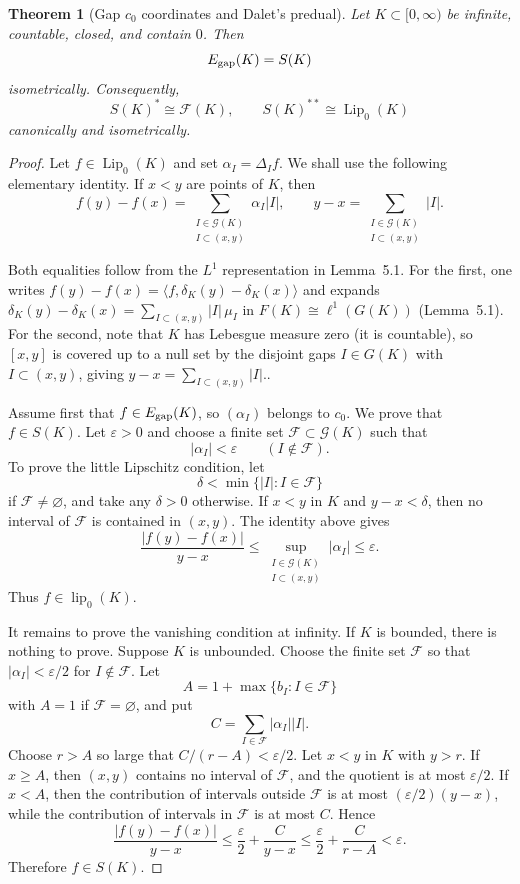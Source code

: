 \documentclass[11pt]{amsart}
\theoremstyle{plain}
\newtheorem{theorem}{Theorem}[section]
\theoremstyle{definition}
\theoremstyle{remark}
\newcommand{\Lip}{\operatorname{Lip}}
\newcommand{\lip}{\operatorname{lip}}
\newcommand{\F}{\mathcal F}
\begin{document}
\begin{theorem}[Gap $c_0$ coordinates and Dalet's predual]
\label{thm:gap-dalet}
Let $K\subset[0,\infty)$ be infinite, countable, closed, and contain $0$. Then
\[
        E_{\rm gap}(K)=S(K)
\]
isometrically. Consequently,
\[
        S(K)^*\cong \F(K),
        \qquad
        S(K)^{**}\cong \Lip_0(K)
\]
canonically and isometrically.
\end{theorem}

\begin{proof}
Let $f\in\Lip_0(K)$ and set $\alpha_I=\Delta_I f$. We shall use the
following elementary identity. If $x<y$ are points of $K$, then
\[
        f(y)-f(x)=
        \sum_{\substack{I\in\mathcal G(K)\\ I\subset (x,y)}}
        \alpha_I |I|,
        \qquad
        y-x=
        \sum_{\substack{I\in\mathcal G(K)\\ I\subset (x,y)}} |I|.
\]


Both equalities follow from the $L^1$ representation in Lemma~5.1.
For the first, one writes $f(y)-f(x)=\langle f,\delta_K(y)-\delta_K(x)\rangle$
and expands $\delta_K(y)-\delta_K(x)=\sum_{I\subset(x,y)}|I|\,\mu_I$
in $F(K)\cong\ell^1(G(K))$ (Lemma~5.1).
For the second, note that $K$ has Lebesgue measure zero
(it is countable), so $[x,y]$ is covered up to a null set
by the disjoint gaps $I\in G(K)$ with $I\subset(x,y)$,
giving $y-x=\sum_{I\subset(x,y)}|I|$..

Assume first that $f\in E_{\rm gap}(K)$, so $(\alpha_I)$ belongs to $c_0$.
We prove that $f\in S(K)$. Let $\varepsilon>0$ and choose a finite set
$\mathcal F\subset\mathcal G(K)$ such that
\[
        |\alpha_I|<\varepsilon
        \qquad(I\notin\mathcal F).
\]
To prove the little Lipschitz condition, let
\[
        \delta<\min\{|I|:I\in\mathcal F\}
\]
if $\mathcal F\ne\varnothing$, and take any $\delta>0$ otherwise. If
$x<y$ in $K$ and $y-x<\delta$, then no interval of $\mathcal F$ is contained
in $(x,y)$. The identity above gives
\[
        \frac{|f(y)-f(x)|}{y-x}
        \le
        \sup_{\substack{I\in\mathcal G(K)\\ I\subset(x,y)}}|
        \alpha_I|
        \le \varepsilon.
\]
Thus $f\in\lip_0(K)$.

It remains to prove the vanishing condition at infinity. If $K$ is bounded,
there is nothing to prove. Suppose $K$ is unbounded. Choose the finite set
$\mathcal F$ so that $|\alpha_I|<\varepsilon/2$ for $I\notin\mathcal F$.
Let
\[
        A=1+\max\{b_I:I\in\mathcal F\}
\]
with $A=1$ if $\mathcal F=\varnothing$, and put
\[
        C=\sum_{I\in\mathcal F} |\alpha_I| |I|.
\]
Choose $r>A$ so large that $C/(r-A)<\varepsilon/2$. Let $x<y$ in $K$ with
$y>r$. If $x\ge A$, then $(x,y)$ contains no interval of $\mathcal F$, and
the quotient is at most $\varepsilon/2$. If $x<A$, then the contribution of
intervals outside $\mathcal F$ is at most $(\varepsilon/2)(y-x)$, while the
contribution of intervals in $\mathcal F$ is at most $C$. Hence
\[
        \frac{|f(y)-f(x)|}{y-x}
        \le \frac{\varepsilon}{2}+\frac{C}{y-x}
        \le \frac{\varepsilon}{2}+\frac{C}{r-A}
        <\varepsilon.
\]
Therefore $f\in S(K)$.


\end{proof}
\end{document}
